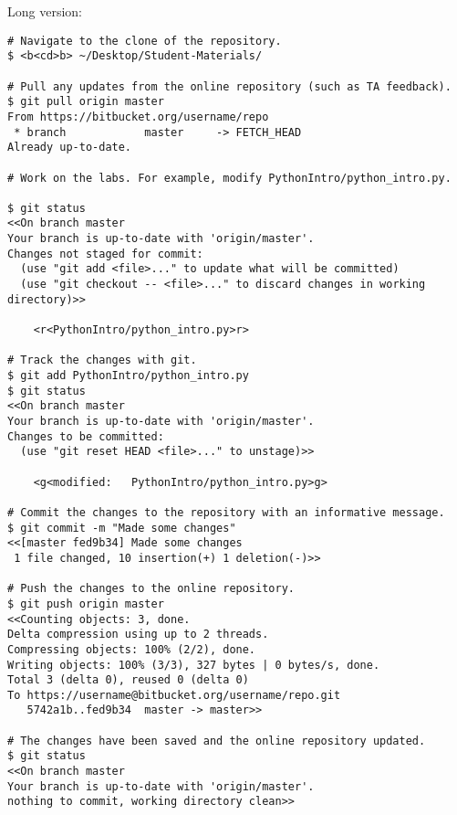 Long version:
\begin{lstlisting}
# Navigate to the clone of the repository.
$ <b<cd>b> ~/Desktop/Student-Materials/

# Pull any updates from the online repository (such as TA feedback).
$ git pull origin master
From https://bitbucket.org/username/repo
 * branch            master     -> FETCH_HEAD
Already up-to-date.

# Work on the labs. For example, modify PythonIntro/python_intro.py.

$ git status
<<On branch master
Your branch is up-to-date with 'origin/master'.
Changes not staged for commit:
  (use "git add <file>..." to update what will be committed)
  (use "git checkout -- <file>..." to discard changes in working directory)>>

    <r<PythonIntro/python_intro.py>r>

# Track the changes with git.
$ git add PythonIntro/python_intro.py
$ git status
<<On branch master
Your branch is up-to-date with 'origin/master'.
Changes to be committed:
  (use "git reset HEAD <file>..." to unstage)>>

    <g<modified:   PythonIntro/python_intro.py>g>

# Commit the changes to the repository with an informative message.
$ git commit -m "Made some changes"
<<[master fed9b34] Made some changes
 1 file changed, 10 insertion(+) 1 deletion(-)>>

# Push the changes to the online repository.
$ git push origin master
<<Counting objects: 3, done.
Delta compression using up to 2 threads.
Compressing objects: 100% (2/2), done.
Writing objects: 100% (3/3), 327 bytes | 0 bytes/s, done.
Total 3 (delta 0), reused 0 (delta 0)
To https://username@bitbucket.org/username/repo.git
   5742a1b..fed9b34  master -> master>>

# The changes have been saved and the online repository updated.
$ git status
<<On branch master
Your branch is up-to-date with 'origin/master'.
nothing to commit, working directory clean>>
\end{lstlisting}
